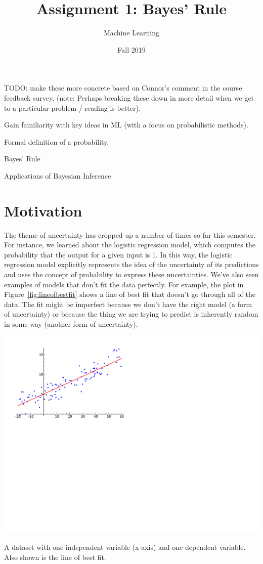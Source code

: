 \documentclass[assignment01_Solutions]{subfiles}
\title{Assignment 1: Bayes' Rule}
\author{Machine Learning}
\date{Fall 2019}
\begin{document}
\maketitle
\thispagestyle{firstpage}


TODO: make these more concrete based on Connor's comment in the course feedback survey. (note: Perhaps breaking these down in more detail when we get to a particular problem / reading is better).

\begin{learningobjectives}
\bi
\item Gain familiarity with key ideas in ML (with a focus on probabilistic methods).
\item Formal definition of a probability.
\item Bayes' Rule
\item Applications of Bayesian Inference
\ei
\end{learningobjectives}

\section{Motivation}
The theme of uncertainty has cropped up a number of times so far this semester.  For instance, we learned about the logistic regression model, which computes the probability that the output for a given input is 1.  In this way, the logistic regression model explicitly represents the idea of the uncertainty of its predictions and uses the concept of probability to express these uncertainties.  We’ve also seen examples of models that don’t fit the data perfectly.  For example, the plot in Figure~\ref{fig:lineofbestfit} shows a line of best fit that doesn't go through all of the data.  The fit might be imperfect because we don't have the right model (a form of uncertainty) or because the thing we are trying to predict is inherently random in some way (another form of uncertainty).
\begin{marginfigure}
\includegraphics[width=\linewidth]{figures/line_of_best_fit.pdf}
\caption{A dataset with one independent variable (x-axis) and one dependent variable.  Also shown is the line of best fit.\label{fig:lineofbestfit}}
\end{marginfigure}
\end{document}
